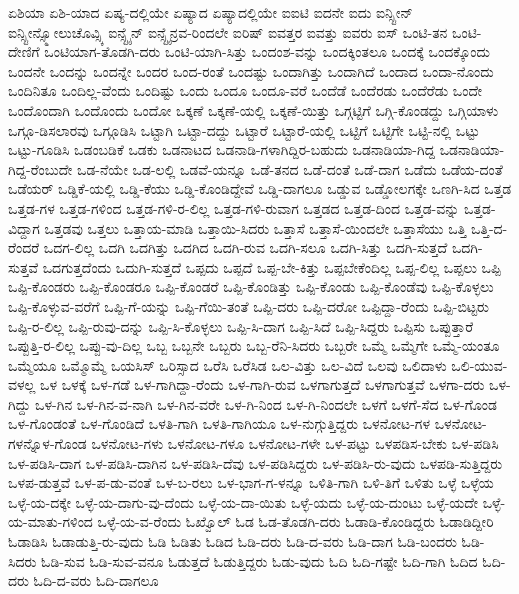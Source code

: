 {ಏಶಿಯಾ
ಏಶಿ-ಯಾದ
ಏಷ್ಯ-ದಲ್ಲಿಯೇ
ಏಷ್ಯಾದ
ಏಷ್ಯಾದಲ್ಲಿಯೇ
ಐಐಟಿ
ಐದನೇ
ಐದು
ಐನ್ಸ್ಟೀನ್
ಐನ್ಸ್ಟೀನ್ಸ್ಮೋಲುಚೊವ್ಸ್ಕಿ
ಐನ್ಸ್ಟೈನ್
ಐನ್ಸ್ಟೈನ್ರವ-ರಿಂದಲೇ
ಐರಿಷ್
ಐವತ್ತರ
ಐವತ್ತು
ಐವರು
ಐಸ್
ಒಂಟಿ-ತನ
ಒಂಟಿ-ದೇಣಿಗೆ
ಒಂಟಿಯಾಗ-ತೊಡಗಿ-ದರು
ಒಂಟಿ-ಯಾಗಿ-ಸಿತ್ತು
ಒಂದಂಶ-ವನ್ನು
ಒಂದಕ್ಕಿಂತಲೂ
ಒಂದಕ್ಕೆ
ಒಂದಕ್ಕೊಂದು
ಒಂದನೇ
ಒಂದನ್ನು
ಒಂದನ್ನೇ
ಒಂದರ
ಒಂದ-ರಂತೆ
ಒಂದಷ್ಟು
ಒಂದಾಗಿತ್ತು
ಒಂದಾಗಿದೆ
ಒಂದಾದ
ಒಂದಾ-ನೊಂದು
ಒಂದಿನಿತೂ
ಒಂದಿಲ್ಲ-ವೆಂದು
ಒಂದಿಷ್ಟು
ಒಂದು
ಒಂದೂ
ಒಂದೂ-ವರೆ
ಒಂದೆಡೆ
ಒಂದೆರಡು
ಒಂದೆರೆಡು
ಒಂದೇ
ಒಂದೊಂದಾಗಿ
ಒಂದೊಂದು
ಒಂದೋ
ಒಕ್ಕಣೆ
ಒಕ್ಕಣೆ-ಯಲ್ಲಿ
ಒಕ್ಕಣೆ-ಯಿತ್ತು
ಒಗ್ಗಟ್ಟಿಗೆ
ಒಗ್ಗಿ-ಕೊಂಡದ್ದು
ಒಗ್ಗಿಯಾಳು
ಒಗ್ಗೂ-ಡಿಸಲಾರವು
ಒಗ್ಗೂಡಿಸಿ
ಒಟ್ಟಾಗಿ
ಒಟ್ಟಾ-ದದ್ದು
ಒಟ್ಟಾರೆ
ಒಟ್ಟಾರೆ-ಯಲ್ಲಿ
ಒಟ್ಟಿಗೆ
ಒಟ್ಟಿಗೇ
ಒಟ್ಟಿ-ನಲ್ಲಿ
ಒಟ್ಟು
ಒಟ್ಟು-ಗೂಡಿಸಿ
ಒಡಂಬಡಿಕೆ
ಒಡಕು
ಒಡನಾಟದ
ಒಡನಾಡಿ-ಗಳಾಗಿದ್ದಿರ-ಬಹುದು
ಒಡನಾಡಿಯಾ-ಗಿದ್ದ
ಒಡನಾಡಿಯಾ-ಗಿದ್ದ-ರೆಂಬುದೇ
ಒಡ-ನೆಯೇ
ಒಡ-ಲಲ್ಲಿ
ಒಡವೆ-ಯನ್ನೂ
ಒಡೆ-ತನದ
ಒಡೆ-ದಂತೆ
ಒಡೆ-ದಾಗ
ಒಡೆದು
ಒಡೆಯ-ದಂತೆ
ಒಡೆಯರ್
ಒಡ್ಡಿಕೆ-ಯಲ್ಲಿ
ಒಡ್ಡಿ-ಕೆಯು
ಒಡ್ಡಿ-ಕೊಂಡಿದ್ದೇವೆ
ಒಡ್ಡಿ-ದಾಗಲೂ
ಒಡ್ಡುವ
ಒಡ್ಡೋಲಗಕ್ಕೇ
ಒಣಗಿ-ಸಿದ
ಒತ್ತಡ
ಒತ್ತಡ-ಗಳ
ಒತ್ತಡ-ಗಳಿಂದ
ಒತ್ತಡ-ಗಳಿ-ರ-ಲಿಲ್ಲ
ಒತ್ತಡ-ಗಳಿ-ರುವಾಗ
ಒತ್ತಡದ
ಒತ್ತಡ-ದಿಂದ
ಒತ್ತಡ-ವನ್ನು
ಒತ್ತಡ-ವಿದ್ದಾಗ
ಒತ್ತಡವು
ಒತ್ತಲು
ಒತ್ತಾಯ-ಮಾಡಿ
ಒತ್ತಾಯಿ-ಸಿದರು
ಒತ್ತಾಸೆ
ಒತ್ತಾಸೆ-ಯಿಂದಲೇ
ಒತ್ತಾಸೆಯು
ಒತ್ತಿ
ಒತ್ತಿ-ದ-ರೆಂದರೆ
ಒದಗ-ಲಿಲ್ಲ
ಒದಗಿ
ಒದಗಿತ್ತು
ಒದಗಿದ
ಒದಗಿ-ರುವ
ಒದಗಿ-ಸಲೂ
ಒದಗಿ-ಸಿತ್ತು
ಒದಗಿ-ಸುತ್ತದೆ
ಒದಗಿ-ಸುತ್ತವೆ
ಒದಗುತ್ತದೆಂದು
ಒದುಗಿ-ಸುತ್ತದೆ
ಒಪ್ಪದು
ಒಪ್ಪದೆ
ಒಪ್ಪ-ಬೇ-ಕಿತ್ತು
ಒಪ್ಪಬೇಕೆಂದಿಲ್ಲ
ಒಪ್ಪ-ಲಿಲ್ಲ
ಒಪ್ಪಲು
ಒಪ್ಪಿ
ಒಪ್ಪಿ-ಕೊಂಡರು
ಒಪ್ಪಿ-ಕೊಂಡರೂ
ಒಪ್ಪಿ-ಕೊಂಡರೆ
ಒಪ್ಪಿ-ಕೊಂಡಿತ್ತು
ಒಪ್ಪಿ-ಕೊಂಡು
ಒಪ್ಪಿ-ಕೊಂಡೆವು
ಒಪ್ಪಿ-ಕೊಳ್ಳಲು
ಒಪ್ಪಿ-ಕೊಳ್ಳುವ-ವರೆಗೆ
ಒಪ್ಪಿ-ಗೆ-ಯನ್ನು
ಒಪ್ಪಿ-ಗೆಯಿ-ತಂತೆ
ಒಪ್ಪಿ-ದರು
ಒಪ್ಪಿ-ದರೋ
ಒಪ್ಪಿದ್ದಾ-ರೆಂದು
ಒಪ್ಪಿ-ಬಿಟ್ಟರು
ಒಪ್ಪಿ-ರ-ಲಿಲ್ಲ
ಒಪ್ಪಿ-ರುವು-ದನ್ನು
ಒಪ್ಪಿ-ಸಿ-ಕೊಳ್ಳಲು
ಒಪ್ಪಿ-ಸಿ-ದಾಗ
ಒಪ್ಪಿ-ಸಿದೆ
ಒಪ್ಪಿ-ಸಿದ್ದರು
ಒಪ್ಪಿಸು
ಒಪ್ಪುತ್ತಾರೆ
ಒಪ್ಪುತ್ತಿ-ರ-ಲಿಲ್ಲ
ಒಪ್ಪು-ವು-ದಿಲ್ಲ
ಒಬ್ಬ
ಒಬ್ಬನೇ
ಒಬ್ಬರು
ಒಬ್ಬ-ರೆನಿ-ಸಿದರು
ಒಬ್ಬರೇ
ಒಮ್ಮೆ
ಒಮ್ಮೆಗೇ
ಒಮ್ಮೆ-ಯಂತೂ
ಒಮ್ಮೆಯೂ
ಒಮ್ಮೊಮ್ಮೆ
ಒಯಸಿಸ್
ಒರಿಸ್ಸಾದ
ಒರೆಸಿ
ಒರೆಸಿಡ
ಒಲ-ವಿತ್ತು
ಒಲ-ವಿದೆ
ಒಲವು
ಒಲಿದಾಳು
ಒಲಿ-ಯುವ-ವಳಲ್ಲ
ಒಳ
ಒಳಕ್ಕೆ
ಒಳ-ಗಡೆ
ಒಳ-ಗಾಗಿದ್ದಾ-ರೆಂದು
ಒಳ-ಗಾಗಿ-ರುವ
ಒಳಗಾಗುತ್ತದೆ
ಒಳಗಾಗುತ್ತವೆ
ಒಳಗಾ-ದರು
ಒಳ-ಗಿದ್ದು
ಒಳ-ಗಿನ
ಒಳ-ಗಿನ-ವ-ನಾಗಿ
ಒಳ-ಗಿನ-ವರೇ
ಒಳ-ಗಿ-ನಿಂದ
ಒಳ-ಗಿ-ನಿಂದಲೇ
ಒಳಗೆ
ಒಳಗೆ-ಸೆದ
ಒಳ-ಗೊಂಡ
ಒಳ-ಗೊಂಡಂತೆ
ಒಳ-ಗೊಂಡಿದೆ
ಒಳತಿ-ಗಾಗಿ
ಒಳತಿ-ಗಾಗಿಯೂ
ಒಳ-ನುಗ್ಗುತ್ತಿದ್ದರು
ಒಳನೋಟ-ಗಳ
ಒಳನೋಟ-ಗಳನ್ನೊಳ-ಗೊಂಡ
ಒಳನೋಟ-ಗಳು
ಒಳನೋಟ-ಗಳೂ
ಒಳನೋಟ-ಗಳೇ
ಒಳ-ಪಟ್ಟು
ಒಳಪಡಿಸ-ಬೇಕು
ಒಳ-ಪಡಿಸಿ
ಒಳ-ಪಡಿಸಿ-ದಾಗ
ಒಳ-ಪಡಿಸಿ-ದಾಗಿನ
ಒಳ-ಪಡಿಸಿ-ದೆವು
ಒಳ-ಪಡಿಸಿದ್ದರು
ಒಳ-ಪಡಿಸಿ-ರು-ವುದು
ಒಳಪಡಿ-ಸುತ್ತಿದ್ದರು
ಒಳಪ-ಡುತ್ತವೆ
ಒಳ-ಪ-ಡು-ವಂತೆ
ಒಳ-ಬ-ರಲು
ಒಳ-ಭಾಗ-ಗ-ಳನ್ನೂ
ಒಳಿತಿ-ಗಾಗಿ
ಒಳಿ-ತಿಗೆ
ಒಳಿತು
ಒಳ್ಳೆ
ಒಳ್ಳೆಯ
ಒಳ್ಳೆ-ಯ-ದಕ್ಕೇ
ಒಳ್ಳೆ-ಯ-ದಾಗು-ವು-ದೆಂದು
ಒಳ್ಳೆ-ಯ-ದಾ-ಯಿತು
ಒಳ್ಳೆ-ಯದು
ಒಳ್ಳೆ-ಯ-ದುಂಟು
ಒಳ್ಳೆ-ಯದೇ
ಒಳ್ಳೆ-ಯ-ಮಾತು-ಗಳಿಂದ
ಒಳ್ಳೆ-ಯ-ವ-ರೆಂದು
ಓಖ್ವೊಲ್
ಓಡ
ಓಡ-ತೊಡಗಿ-ದರು
ಓಡಾಡಿ-ಕೊಂಡಿದ್ದರು
ಓಡಾಡಿದ್ದೀರಿ
ಓಡಾಡಿಸಿ
ಓಡಾಡುತ್ತಿ-ರು-ವುದು
ಓಡಿ
ಓಡಿತು
ಓಡಿದ
ಓಡಿ-ದರು
ಓಡಿ-ದ-ವರು
ಓಡಿ-ದಾಗ
ಓಡಿ-ಬಂದರು
ಓಡಿ-ಸಿದರು
ಓಡಿ-ಸುವ
ಓಡಿ-ಸುವ-ವನೂ
ಓಡುತ್ತದೆ
ಓಡುತ್ತಿದ್ದರು
ಓಡು-ವುದು
ಓದಿ
ಓದಿ-ಗಷ್ಟೇ
ಓದಿ-ಗಾಗಿ
ಓದಿದ
ಓದಿ-ದರು
ಓದಿ-ದ-ವರು
ಓದಿ-ದಾಗಲೂ
}
